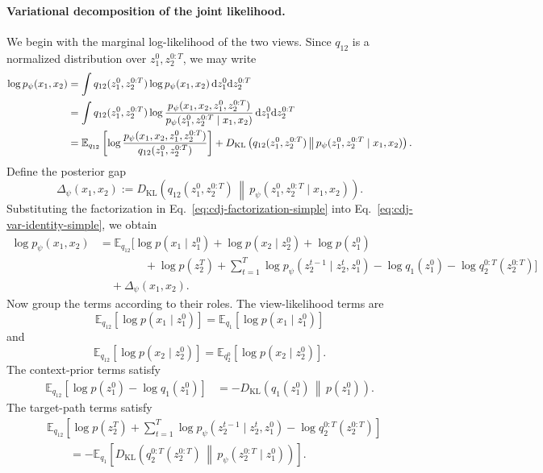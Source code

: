 \documentclass{article}
\newcommand{\E}{\mathbb{E}}
\newcommand{\KL}{D_{\mathrm{KL}}}
\begin{document}
\paragraph{Variational decomposition of the joint likelihood.}
We begin with the marginal log-likelihood of the two views. Since $q_{12}$ is a
normalized distribution over $z_1^0,z_2^{0:T}$, we may write
\begin{align}
\log p_\psi(x_1,x_2)
&=
\int q_{12}(z_1^0,z_2^{0:T})
\log p_\psi(x_1,x_2)
\,\mathrm{d}z_1^0\mathrm{d}z_2^{0:T}
\notag \\
&=
\int q_{12}(z_1^0,z_2^{0:T})
\log
\frac{
p_\psi(x_1,x_2,z_1^0,z_2^{0:T})
}{
p_\psi(z_1^0,z_2^{0:T}\mid x_1,x_2)
}
\,\mathrm{d}z_1^0\mathrm{d}z_2^{0:T}
\notag \\
&=
\E_{q_{12}}
\left[
\log
\frac{
p_\psi(x_1,x_2,z_1^0,z_2^{0:T})
}{
q_{12}(z_1^0,z_2^{0:T})
}
\right]
+
\KL
\left(
q_{12}(z_1^0,z_2^{0:T})
\,\middle\|\,
p_\psi(z_1^0,z_2^{0:T}\mid x_1,x_2)
\right).
\label{eq:cdj-var-identity-simple}
\end{align}
Define the posterior gap
\begin{equation}
\Delta_\psi(x_1,x_2)
:=
\KL
\left(
q_{12}(z_1^0,z_2^{0:T})
\,\middle\|\,
p_\psi(z_1^0,z_2^{0:T}\mid x_1,x_2)
\right).
\label{eq:cdj-posterior-gap-simple}
\end{equation}
Substituting the factorization in Eq.~\eqref{eq:cdj-factorization-simple} into
Eq.~\eqref{eq:cdj-var-identity-simple}, we obtain
\begin{align}
\log p_\psi(x_1,x_2)
&=
\E_{q_{12}}
\Bigg[
\log p(x_1\mid z_1^0)
+
\log p(x_2\mid z_2^0)
+
\log p(z_1^0)
\nonumber \\
&\qquad\qquad
+
\log p(z_2^T)
+
\sum_{t=1}^{T}
\log p_\psi(z_2^{t-1}\mid z_2^t,z_1^0)
-
\log q_1(z_1^0)
-
\log q_2^{0:T}(z_2^{0:T})
\Bigg]
\nonumber \\
&\quad
+
\Delta_\psi(x_1,x_2).
\label{eq:cdj-expanded-elbo-raw}
\end{align}
Now group the terms according to their roles. The view-likelihood terms are
\[
\E_{q_{12}}[\log p(x_1\mid z_1^0)]
=
\E_{q_1}[\log p(x_1\mid z_1^0)]
\]
and
\[
\E_{q_{12}}[\log p(x_2\mid z_2^0)]
=
\E_{q_2^0}[\log p(x_2\mid z_2^0)].
\]
The context-prior terms satisfy
\begin{align}
\E_{q_{12}}
\left[
\log p(z_1^0)-\log q_1(z_1^0)
\right]
&=
-
\KL
\left(
q_1(z_1^0)
\,\middle\|\,
p(z_1^0)
\right).
\label{eq:cdj-context-kl-instance}
\end{align}
The target-path terms satisfy
\begin{align}
&\E_{q_{12}}
\left[
\log p(z_2^T)
+
\sum_{t=1}^{T}
\log p_\psi(z_2^{t-1}\mid z_2^t,z_1^0)
-
\log q_2^{0:T}(z_2^{0:T})
\right]
\nonumber \\
&\qquad
=
-
\E_{q_1}
\left[
\KL
\left(
q_2^{0:T}(z_2^{0:T})
\,\middle\|\,
p_\psi(z_2^{0:T}\mid z_1^0)
\right)
\right].
\label{eq:cdj-path-kl-instance-expanded}
\end{align}
\end{document}
